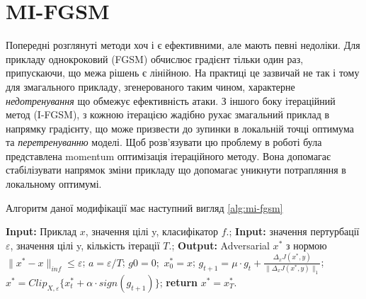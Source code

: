 \documentclass[a4paper,14pt]{extreport}
\renewcommand{\algorithmicrequire}{\textbf{Input: }}
\renewcommand{\algorithmicensure}{\textbf{Output: }}
\newcommand{\algorithmreturn}{\textbf{return }}
\begin{document}

	\section{MI-FGSM}	
	Попередні розглянуті методи хоч і є ефективними, але мають певні недоліки.
	Для прикладу однокроковий (FGSM) обчислює градієнт тільки один раз, припускаючи, що межа рішень є лінійною. На практиці це зазвичай не так і тому для змагального прикладу, згенерованого таким чином, характерне \textit{недотренування} що обмежує ефективність атаки. З іншого боку ітераційний метод (I-FGSM), з кожною ітерацією жадібно рухає змагальний приклад в напрямку градієнту, що може призвести до зупинки в локальній точці оптимума та \textit{перетренуванню} моделі. Щоб розв'язувати цю проблему в роботі \textcite{dong2017boosting} була представлена momentum оптимізація ітераційного методу. Вона допомагає стабілізувати напрямок зміни прикладу що допомагає уникнути потрапляння в локальному оптимумі.
	
	Алгоритм даної модифікації має наступний вигляд \ref{alg:mi-fgsm}	
	\begin{algorithm}
		\caption{$MI-FGSM$}
		\label{alg:mi-fgsm}
		\begin{algorithmic}[1]
			\State \algorithmicrequire{Приклад $x$, значення цілі y, класифікатор $f$.};
			\State \algorithmicrequire{значення пертурбації $\varepsilon$, значення цілі y, кількість ітерації $T$.};
			\State \algorithmicensure{ Adversarial $x^{*}$ з нормою $\|x^{*} - x\|_{inf} \leq \varepsilon $};
			\State $a = \varepsilon / T$;
			\State $g0 = 0;$ $x^{*}_0 = x$;
			\State $g_{t+1} = \mu \cdot g_t + \frac{\Delta_x J(x^{*}, y)}{\|\Delta_x J(x^{*}, y)\|_1}$;
			\State $x^{*} = Clip_{X, \varepsilon} \big\{ x^{*}_{t} + \alpha \cdot sign(g_{t+1}) \big\}$;
			\EndFor
			\State \algorithmreturn{$x^{*} = x^{*}_{T}$}.
		\end{algorithmic}
	\end{algorithm}
	
\end{document}
